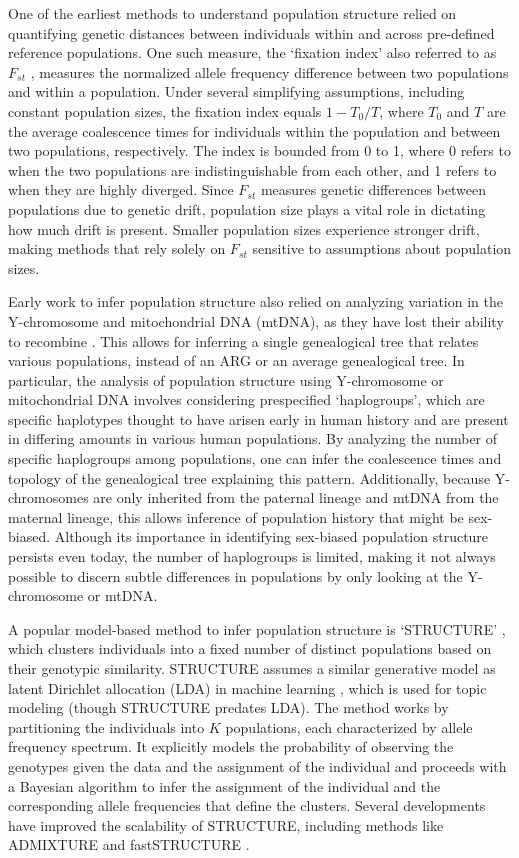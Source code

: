 One of the earliest methods to understand population structure relied on quantifying genetic distances between individuals within and across pre-defined reference populations. One such measure, the `fixation index' also referred to as \(F_{st}\) \cite{Wright1951, Malecot1948}, measures the normalized allele frequency difference between two populations and within a population. Under several simplifying assumptions, including constant population sizes, the fixation index equals \(1 - T_0/T\), where \(T_0\) and \(T\) are the average coalescence times for individuals within the population and between two populations, respectively. The index is bounded from 0 to 1, where 0 refers to when the two populations are indistinguishable from each other, and 1 refers to when they are highly diverged. Since \(F_{st}\) measures genetic differences between populations due to genetic drift, population size plays a vital role in dictating how much drift is present. Smaller population sizes experience stronger drift, making methods that rely solely on \(F_{st}\) sensitive to assumptions about population sizes.

Early work to infer population structure also relied on analyzing variation in the Y-chromosome and mitochondrial DNA (mtDNA), as they have lost their ability to recombine \cite{Cann1987, tilford2001physical}. This allows for inferring a single genealogical tree that relates various populations, instead of an ARG or an average genealogical tree. In particular, the analysis of population structure using Y-chromosome or mitochondrial DNA involves considering prespecified `haplogroups', which are specific haplotypes thought to have arisen early in human history and are present in differing amounts in various human populations. By analyzing the number of specific haplogroups among populations, one can infer the coalescence times and topology of the genealogical tree explaining this pattern. Additionally, because Y-chromosomes are only inherited from the paternal lineage and mtDNA from the maternal lineage, this allows inference of population history that might be sex-biased. Although its importance in identifying sex-biased population structure persists even today, the number of haplogroups is limited, making it not always possible to discern subtle differences in populations by only looking at the Y-chromosome or mtDNA.

A popular model-based method to infer population structure is `STRUCTURE' \cite{Pritchard2000}, which clusters individuals into a fixed number of distinct populations based on their genotypic similarity. STRUCTURE assumes a similar generative model as latent Dirichlet allocation (LDA) in machine learning \cite{Blei2003}, which is used for topic modeling (though STRUCTURE predates LDA). The method works by partitioning the individuals into \(K\) populations, each characterized by allele frequency spectrum. It explicitly models the probability of observing the genotypes given the data and the assignment of the individual and proceeds with a Bayesian algorithm to infer the assignment of the individual and the corresponding allele frequencies that define the clusters. Several developments have improved the scalability of STRUCTURE, including methods like ADMIXTURE \cite{Alexander2009} and fastSTRUCTURE \cite{Raj2014}.

